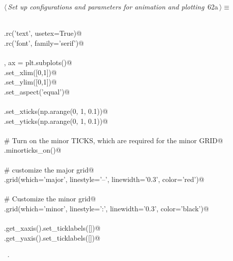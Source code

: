 \documentclass[11.5pt]{report}
\begin{document}
\begin{flushleft} \small
\begin{minipage}{\linewidth}\label{scrap94}\raggedright\small
{} $\langle\,${\itshape Set up configurations and parameters for animation and plotting}\nobreak\ {\footnotesize {62a}}$\,\rangle\equiv$
\vspace{-1ex}
\begin{list}{}{} \item
\mbox{}\verb@@\\
\mbox{}\verb@plt.rc('text', usetex=True)@\\
\mbox{}\verb@plt.rc('font', family='serif')@\\
\mbox{}\verb@@\\
\mbox{}\verb@fig, ax = plt.subplots()@\\
\mbox{}\verb@ax.set_xlim([0,1])@\\
\mbox{}\verb@ax.set_ylim([0,1])@\\
\mbox{}\verb@ax.set_aspect('equal')@\\
\mbox{}\verb@@\\
\mbox{}\verb@ax.set_xticks(np.arange(0, 1, 0.1))@\\
\mbox{}\verb@ax.set_yticks(np.arange(0, 1, 0.1))@\\
\mbox{}\verb@@\\
\mbox{}\verb@# Turn on the minor TICKS, which are required for the minor GRID@\\
\mbox{}\verb@ax.minorticks_on()@\\
\mbox{}\verb@@\\
\mbox{}\verb@# customize the major grid@\\
\mbox{}\verb@ax.grid(which='major', linestyle='--', linewidth='0.3', color='red')@\\
\mbox{}\verb@@\\
\mbox{}\verb@# Customize the minor grid@\\
\mbox{}\verb@ax.grid(which='minor', linestyle=':', linewidth='0.3', color='black')@\\
\mbox{}\verb@@\\
\mbox{}\verb@ax.get_xaxis().set_ticklabels([])@\\
\mbox{}\verb@ax.get_yaxis().set_ticklabels([])@\\
\mbox{}\verb@@{\NWsep}
\end{list}
\vspace{-1.5ex}
\footnotesize
\begin{list}{}{\setlength{\itemsep}{-\parsep}\setlength{\itemindent}{-\leftmargin}}
\item \NWtxtMacroRefIn\ .

\item{}
\end{list}
\end{minipage}\vspace{4ex}
\end{flushleft}
\end{document}
